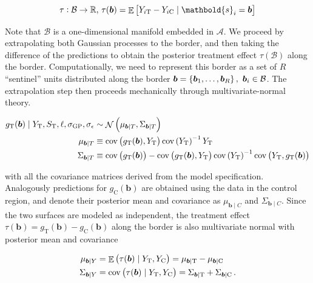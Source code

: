 \documentclass[letter]{article}
\DeclareMathOperator{\E}{\mathbb{E}}
\DeclareMathOperator{\cov}{{cov}}
\DeclareMathOperator{\normal}{\mathcal{N}}
\newcommand{\area}{\mathcal{A}}
\newcommand{\treat}{\mathrm{T}}
\newcommand{\ctrol}{\mathrm{C}}
\newcommand{\sigmaf}{\sigma_{\mathrm{GP}}}
\newcommand{\sigman}{\sigma_{\epsilon}}
\newcommand{\svec}{\mathbold{s}}
\newcommand{\border}{\mathcal{B}}
\newcommand{\sentinels}{\bm{b}}
\newcommand{\eqlabel}[1]{\label{#1}}
\newcommand{\numsent}{R}
\begin{document}
\begin{equation}
\tau: \border \rightarrow \mathbb{R},\,\tau(\sentinels) =  \E\sbr{Y_{i\treat} - Y_{i\ctrol} \mid \svec_i = \sentinels}
\eqlabel{eq:functional_estimand}
\end{equation}

Note that \(\border\) is a one-dimensional manifold embedded in \(\area\).
We proceed by extrapolating both Gaussian processes to the border,
and then taking the difference of the predictions to obtain the posterior treatment effect \(\tau(\border)\) along the border.
Computationally, we need to represent this border as a set of \(\numsent\) ``sentinel'' units distributed along the border \(\sentinels=\cbr{\sentinels_1,\ldots,\sentinels_{\numsent}},~\sentinels_i \in \border\).
The extrapolation step then proceeds mechanically through multivariate-normal theory.

\begin{equation}\begin{split}
    g_\treat{}(\sentinels) \mid Y_\treat{}, S_\treat{}, \ell, \sigmaf, \sigman &\sim \normal\del{\mu_{\sentinels \mid T}, \Sigma_{\sentinels \mid T}} \\
    \mu_{\sentinels \mid T} &\equiv \cov\del{g_\treat{}(\sentinels), Y_\treat{}} \cov\del{Y_\treat{}}^{-1}  Y_\treat{} \\
    \Sigma_{\sentinels \mid T} &\equiv \cov \del{g_\treat{}(\sentinels)} - \cov\del{g_\treat{}(\sentinels), Y_\treat{}} \cov\del{Y_\treat{}}^{-1} \cov\del{Y_\treat{},g_\treat{}(\sentinels)
    }
\end{split}
 \label{eq:postvar2gp_t_or_c}
\end{equation}

with all the covariance matrices derived from the model specification.
Analogously predictions for \(g_\ctrol{}(\sentinels)\) are obtained using the data in the control region, and denote their posterior mean and covariance as \(\mu_{\sentinels \mid C}\) and \(\Sigma_{\sentinels \mid C}\). Since the two surfaces are modeled as independent, the treatment effect \(\tau(\sentinels)=g_\treat{}(\sentinels)-g_\ctrol{}(\sentinels)\) along the border is also multivariate normal with posterior mean and covariance

\begin{equation}
\begin{split}
    \mu_{\sentinels \mid Y} &= \E \del{\tau(\sentinels) \mid Y_\treat{}, Y_\ctrol{}} = \mu_{\sentinels \mid \treat} - \mu_{\sentinels \mid \ctrol} \\
    \Sigma_{\sentinels \mid Y} &= \cov\del{\tau(\sentinels) \mid Y_\treat{}, Y_\ctrol{}} = \Sigma_{\sentinels \mid \treat} + \Sigma_{\sentinels \mid \ctrol}\,.
\end{split}
\eqlabel{eq:postvar2gp}
\end{equation}
    
\end{document}
